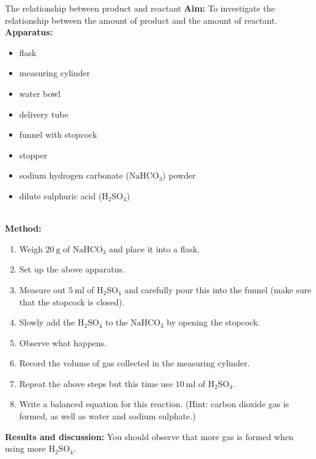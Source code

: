 \vspace{-1cm}
\begin{g_experiment}{The relationship between product and reactant}
\textbf{Aim:} To investigate the relationship between the amount of product and the amount of reactant.\\
\textbf{Apparatus:}\\
\begin{minipage}{.5\textwidth}
 \begin{itemize}[noitemsep]
  \item flask
\item measuring cylinder
\item water bowl
\item delivery tube
\item funnel with stopcock
\item stopper
\item sodium hydrogen carbonate ($\text{NaHCO}_{3}$) powder
\item dilute sulphuric acid ($\text{H}_{2}\text{SO}_{4}$)
 \end{itemize}
\end{minipage}
\begin{minipage}{.5\textwidth}
\begin{center}
\end{center}
\end{minipage} \\
\textbf{Method:} 
\begin{enumerate}[noitemsep,label=\textbf{\arabic*}]
 \item Weigh $20~\text{g}$ of $\text{NaHCO}_{3}$ and place it into a flask.
\item Set up the above apparatus.
\item Measure out $5~\text{ml}$ of $\text{H}_{2}\text{SO}_{4}$ and carefully pour this into the funnel (make sure that the stopcock is closed).
\item Slowly add the $\text{H}_{2}\text{SO}_{4}$ to the $\text{NaHCO}_{3}$ by opening the stopcock.
\item Observe what happens.
\item Record the volume of gas collected in the measuring cylinder.
\item Repeat the above steps but this time use $10~\text{ml}$ of $\text{H}_{2}\text{SO}_{4}$.
\item Write a balanced equation for this reaction. (Hint: carbon dioxide gas is formed, as well as water and sodium sulphate.)
\end{enumerate}
\textbf{Results and discussion: } You should observe that more gas is formed when using more $\text{H}_{2}\text{SO}_{4}$. 
\end{g_experiment}

